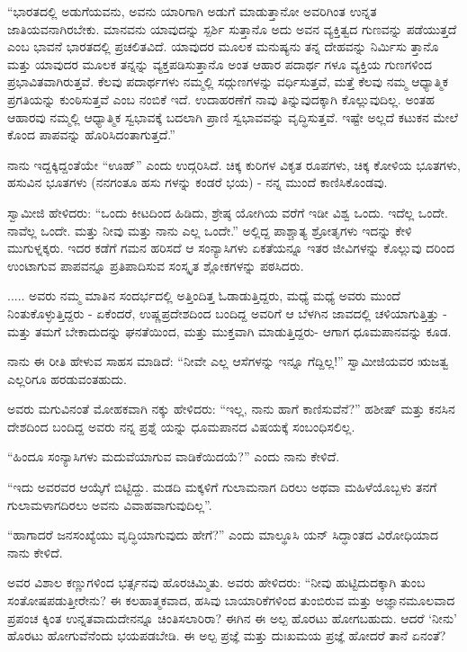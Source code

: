 “ಭಾರತದಲ್ಲಿ ಅಡುಗೆಯವನು, ಅವನು ಯಾರಿಗಾಗಿ ಅಡುಗೆ ಮಾಡುತ್ತಾನೋ ಅವರಿಗಿಂತ ಉನ್ನತ ಜಾತಿಯವನಾಗಿರಬೇಕು. ಮಾನವನು ಯಾವುದನ್ನು ಸ್ಪರ್ಶಿ ಸುತ್ತಾನೊ ಅದು ಅವನ ವ್ಯಕ್ತಿತ್ವದ ಗುಣವನ್ನು ಪಡೆಯುತ್ತದೆ ಎಂಬ ಭಾವನೆ ಭಾರತದಲ್ಲಿ ಪ್ರಚಲಿತವಿದೆ. ಯಾವುದರ ಮೂಲಕ ಮನುಷ್ಯನು ತನ್ನ ದೇಹವನ್ನು ನಿರ್ಮಿಸು ತ್ತಾನೊ ಮತ್ತು ಯಾವುದರ ಮೂಲಕ ತನ್ನನ್ನು ವ್ಯಕ್ತಪಡಿಸುತ್ತಾನೊ ಅಂತ ಆಹಾರ ಪದಾರ್ಥ ಗಳೂ ವ್ಯಕ್ತಿಯ ಗುಣಗಳಿಂದ ಪ್ರಭಾವಿತವಾಗಿರುತ್ತವೆ. ಕೆಲವು ಪದಾರ್ಥಗಳು ನಮ್ಮಲ್ಲಿ ಸದ್ಗುಣಗಳನ್ನು ವರ್ಧಿಸುತ್ತವೆ, ಮತ್ತೆ ಕೆಲವು ನಮ್ಮ ಆಧ್ಯಾತ್ಮಿಕ ಪ್ರಗತಿಯನ್ನು ಕುಂಠಿಸುತ್ತವೆ ಎಂಬ ನಂಬಿಕೆ ಇದೆ. ಉದಾಹರಣೆಗೆ ನಾವು ತಿನ್ನುವುದಕ್ಕಾಗಿ ಕೊಲ್ಲುವುದಿಲ್ಲ. ಅಂತಹ ಆಹಾರವು ನಮ್ಮಲ್ಲಿ ಆಧ್ಯಾತ್ಮಿಕ ಸ್ವಭಾವಕ್ಕೆ ಬದಲಾಗಿ ಪ್ರಾಣಿ ಸ್ವಭಾವವನ್ನು ವೃದ್ಧಿಸುತ್ತವೆ. ಇಷ್ಟೇ ಅಲ್ಲದೆ ಕಟುಕನ ಮೇಲೆ ಕೊಂದ ಪಾಪವನ್ನು ಹೊರಿಸಿದಂತಾಗುತ್ತದೆ.”

ನಾನು ಇದ್ದಕ್ಕಿದ್ದಂತೆಯೇ “ಊಹ್” ಎಂದು ಉದ್ಗರಿಸಿದೆ. ಚಿಕ್ಕ ಕುರಿಗಳ ವಿಕೃತ ರೂಪಗಳು, ಚಿಕ್ಕ ಕೋಳಿಯ ಭೂತಗಳು, ಹಸುವಿನ ಭೂತಗಳು (ನನಗಂತೂ ಹಸು ಗಳನ್ನು ಕಂಡರೆ ಭಯ) - ನನ್ನ ಮುಂದೆ ಕಾಣಿಸಿಕೊಂಡವು.

ಸ್ವಾಮೀಜಿ ಹೇಳಿದರು: “ಒಂದು ಕೀಟದಿಂದ ಹಿಡಿದು, ಶ್ರೇಷ್ಠ ಯೋಗಿಯ ವರೆಗೆ ಇಡೀ ವಿಶ್ವ ಒಂದು. ಇದೆಲ್ಲ ಒಂದೇ. ನಾವೆಲ್ಲ ಒಂದೇ. ಮತ್ತು ನೀವು ಮತ್ತು ನಾನು ಎಲ್ಲ ಒಂದೇ.” ಅಲ್ಲಿದ್ದ ಪಾಶ್ಚಾತ್ಯ ಶ್ರೋತೃಗಳು ಇದನ್ನು ಕೇಳಿ ಮುಗುಳ್ನಕ್ಕರು. ಇದರ ಕಡೆಗೆ ಗಮನ ಹರಿಸದೆ ಆ ಸಂನ್ಯಾಸಿಗಳು ಏಕತೆಯನ್ನೂ ಇತರ ಜೀವಿಗಳನ್ನು ಕೊಲ್ಲುವು ದರಿಂದ ಉಂಟಾಗುವ ಪಾಪವನ್ನೂ ಪ್ರತಿಪಾದಿಸುವ ಸಂಸ್ಕೃತ ಶ್ಲೋಕಗಳನ್ನು ಪಠಸಿದರು.

..... ಅವರು ನಮ್ಮ ಮಾತಿನ ಸಂದರ್ಭದಲ್ಲಿ ಅತ್ತಿಂದಿತ್ತ ಓಡಾಡುತ್ತಿದ್ದರು, ಮಧ್ಯೆ ಮಧ್ಯೆ ಅವರು  ಮುಂದೆ ನಿಂತುಕೊಳ್ಳುತ್ತಿದ್ದರು - ಏಕೆಂದರೆ, ಉಷ್ಣಪ್ರದೇಶದಿಂದ ಬಂದಿದ್ದ ಅವರಿಗೆ ಆ ಬೆಳಗಿನ ಜಾವದಲ್ಲಿ ಚಳಿಯಾಗುತ್ತಿತ್ತು - ಮತ್ತು ತಮಗೆ ಬೇಕಾದುದನ್ನು ಘನತೆಯಿಂದ, ಮತ್ತು ಮುಕ್ತವಾಗಿ ಮಾಡುತ್ತಿದ್ದರು- ಆಗಾಗ ಧೂಮಪಾನವನ್ನು ಕೂಡ.

ನಾನು ಈ ರೀತಿ ಹೇಳುವ ಸಾಹಸ ಮಾಡಿದೆ: “ನೀವೇ ಎಲ್ಲ ಆಸೆಗಳನ್ನು ಇನ್ನೂ ಗೆದ್ದಿಲ್ಲ!” ಸ್ವಾಮೀಜಿಯವರ ಋಜತ್ವ ಎಲ್ಲರಿಗೂ ಹರಡುವಂತಹುದು.

ಅವರು ಮಗುವಿನಂತೆ ಮೋಹಕವಾಗಿ ನಕ್ಕು ಹೇಳಿದರು: “ಇಲ್ಲ, ನಾನು ಹಾಗೆ ಕಾಣಿಸುವೆನೆ?” ಹಶೀಷ್ ಮತ್ತು ಕನಸಿನ ದೇಶದಿಂದ ಬಂದಿದ್ದ ಅವರು ನನ್ನ ಪ್ರಶ್ನೆ ಯನ್ನು ಧೂಮಪಾನದ ವಿಷಯಕ್ಕೆ ಸಂಬಂಧಿಸಲಿಲ್ಲ.

“ಹಿಂದೂ ಸಂನ್ಯಾಸಿಗಳು ಮದುವೆಯಾಗುವ ವಾಡಿಕೆಯಿದಯೆ?” ಎಂದು ನಾನು ಕೇಳಿದೆ.

“ಇದು ಅವರವರ ಆಯ್ಕೆಗೆ ಬಿಟ್ಟಿದ್ದು. ಮಡದಿ ಮಕ್ಕಳಿಗೆ ಗುಲಾಮನಾಗ ದಿರಲು ಅಥವಾ ಮಹಿಳೆಯೊಬ್ಬಳು ತನಗೆ ಗುಲಾಮಳಾಗದಿರಲು ಅವನು ವಿವಾಹವಾಗುವುದಿಲ್ಲ”.

“ಹಾಗಾದರೆ ಜನಸಂಖ್ಯೆಯು ವೃದ್ಧಿಯಾಗುವುದು ಹೇಗೆ?” ಎಂದು ಮಾಲ್ಥೂಸಿ ಯನ್ ಸಿದ್ಧಾಂತದ ವಿರೋಧಿಯಾದ ನಾನು ಕೇಳಿದೆ.

ಅವರ ವಿಶಾಲ ಕಣ್ಣುಗಳಿಂದ ಭರ್ತ್ಸನವು ಹೊರಚಿಮ್ಮಿತು. ಅವರು ಹೇಳಿದರು: “ನೀವು ಹುಟ್ಟಿದುದಕ್ಕಾಗಿ ತುಂಬ ಸಂತೋಷಪಡುತ್ತೀರೇನು? ಈ ಕಲಹಾತ್ಮಕವಾದ, ಹಸಿವು ಬಾಯಾರಿಕೆಗಳಿಂದ ತುಂಬಿರುವ ಮತ್ತು ಅಜ್ಞಾನಮೂಲವಾದ ಪ್ರಪಂಚ ಕ್ಕಿಂತ ಉನ್ನತವಾದುದೇನನ್ನೂ ಚಿಂತಿಸಲಾರಿರಾ? ಈಗಿನ ಈ ಅಲ್ಪ ಹೊರಟು ಹೋಗಬಹುದು. ಆದರೆ ‘ನೀನು’ ಹೊರಟು ಹೋಗುವೆನೆಂದು ಭಯಪಡಬೇಡಿ. ಈ ಅಲ್ಪ ಪ್ರಜ್ಞೆ ಮತ್ತು ದುಃಖಮಯ ಪ್ರಜ್ಞೆ ಹೋದರೆ ತಾನೆ ಏನಂತೆ?

